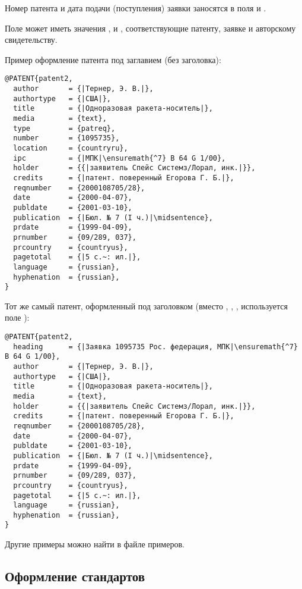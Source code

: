 \documentclass[10pt,a4paper,headings=small,numbers=enddot,english,russian]{ltxdockit}[2011/03/25]
\begin{document}
Номер патента и дата подачи (поступления) заявки заносятся в поля  и
.

Поле  может иметь значения ,  и ,
соответствующие патенту, заявке и авторскому свидетельству.

Пример оформление патента под заглавием (без заголовка):

\begin{lstlisting}[style=bibtex,escapechar=|]
@PATENT{patent2,
  author       = {|Тернер, Э. В.|},
  authortype   = {|США|},
  title        = {|Одноразовая ракета-носитель|},
  media        = {text},
  type         = {patreq},
  number       = {1095735},
  location     = {countryru},
  ipc          = {|МПК|\ensuremath{^7} B 64 G 1/00},
  holder       = {{|заявитель Спейс Системз/Лорал, инк.|}},
  credits      = {|патент. поверенный Егорова Г. Б.|},
  reqnumber    = {2000108705/28},
  date         = {2000-04-07},
  publdate     = {2001-03-10},
  publication  = {|Бюл. № 7 (I ч.)|\midsentence},
  prdate       = {1999-04-09},
  prnumber     = {09/289, 037},
  prcountry    = {countryus},
  pagetotal    = {|5 с.~: ил.|},
  language     = {russian},
  hyphenation  = {russian},
}
\end{lstlisting}

Тот же самый патент, оформленный под заголовком (вместо
, , , 
используется поле ):

\begin{lstlisting}[style=bibtex,escapechar=|]
@PATENT{patent2,
  heading      = {|Заявка 1095735 Рос. федерация, МПК|\ensuremath{^7} B 64 G 1/00},
  author       = {|Тернер, Э. В.|},
  authortype   = {|США|},
  title        = {|Одноразовая ракета-носитель|},
  media        = {text},
  holder       = {{|заявитель Спейс Системз/Лорал, инк.|}},
  credits      = {|патент. поверенный Егорова Г. Б.|},
  reqnumber    = {2000108705/28},
  date         = {2000-04-07},
  publdate     = {2001-03-10},
  publication  = {|Бюл. № 7 (I ч.)|\midsentence},
  prdate       = {1999-04-09},
  prnumber     = {09/289, 037},
  prcountry    = {countryus},
  pagetotal    = {|5 с.~: ил.|},
  language     = {russian},
  hyphenation  = {russian},
}
\end{lstlisting}

Другие примеры можно найти в файле примеров.

\subsection{Оформление стандартов}
\label{sec:standards}
\end{document}
